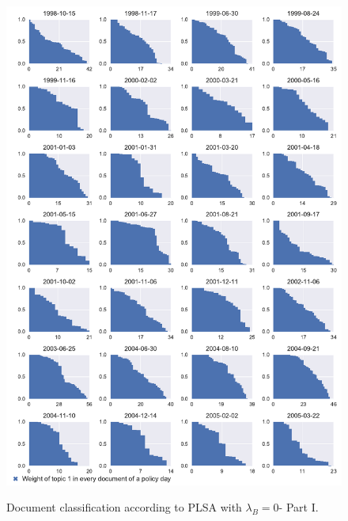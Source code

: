 \documentclass[11pt,a4paper,english,oneside]{book}
\numberwithin{equation}{chapter}
\begin{document}
\begin{figure}
	\caption{Document classification according to PLSA with $\lambda_B = 0$- Part I.}
	\centering
	\includegraphics[scale=0.8]{Images/docsplit01_bgLamb_0_0}
	\label{classdoc01}
\end{figure}
\end{document}
